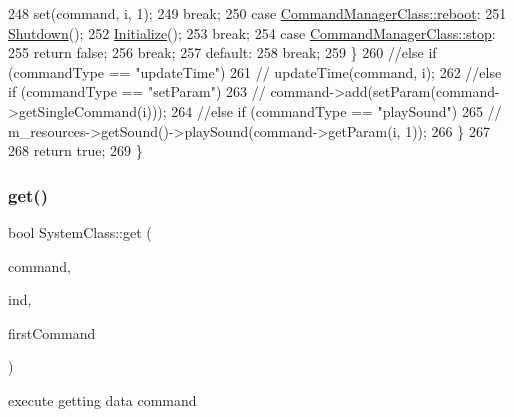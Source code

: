 \begin{DoxyCode}
248             \textcolor{keyword}{set}(command, i, 1);
249             \textcolor{keywordflow}{break};
250         \textcolor{keywordflow}{case} \hyperlink{class_command_manager_class_aff5b4b6301c24b585b22c6abaf4f3131a8799516de427c79cd43d60af44d2e7e7}{CommandManagerClass::reboot}:
251             \hyperlink{class_system_class_a86b7353d60fb279bd1a65c970a216bec}{Shutdown}();
252             \hyperlink{class_system_class_a21f9acab8652feb8cbb8858afc91815a}{Initialize}();
253             \textcolor{keywordflow}{break};
254         \textcolor{keywordflow}{case} \hyperlink{class_command_manager_class_aff5b4b6301c24b585b22c6abaf4f3131a1e4f57112617fb1bf352796462ffeeca}{CommandManagerClass::stop}:
255             \textcolor{keywordflow}{return} \textcolor{keyword}{false};
256             \textcolor{keywordflow}{break};
257         \textcolor{keywordflow}{default}:
258             \textcolor{keywordflow}{break};
259         \}
260         \textcolor{comment}{//else if (commandType == "updateTime")}
261         \textcolor{comment}{//  updateTime(command, i);}
262         \textcolor{comment}{//else if (commandType == "setParam")}
263         \textcolor{comment}{//  command->add(setParam(command->getSingleCommand(i)));}
264         \textcolor{comment}{//else if (commandType == "playSound")}
265         \textcolor{comment}{//  m\_resources->getSound()->playSound(command->getParam(i, 1));}
266     \}
267 
268     \textcolor{keywordflow}{return} \textcolor{keyword}{true};
269 \}
\end{DoxyCode}
\mbox{\label{group__commands_ga5ff4f256861285812190f780dcddff01}} 
\subsubsection{\texorpdfstring{get()}{get()}}
{\footnotesize\ttfamily bool System\+Class\+::get (\begin{DoxyParamCaption}\item[{\hyperlink{class_command_class}{Command\+Class} $\ast$}]{command,  }\item[{int}]{ind,  }\item[{int}]{first\+Command }\end{DoxyParamCaption})\hspace{0.3cm}{\ttfamily [private]}}



execute getting data command 


